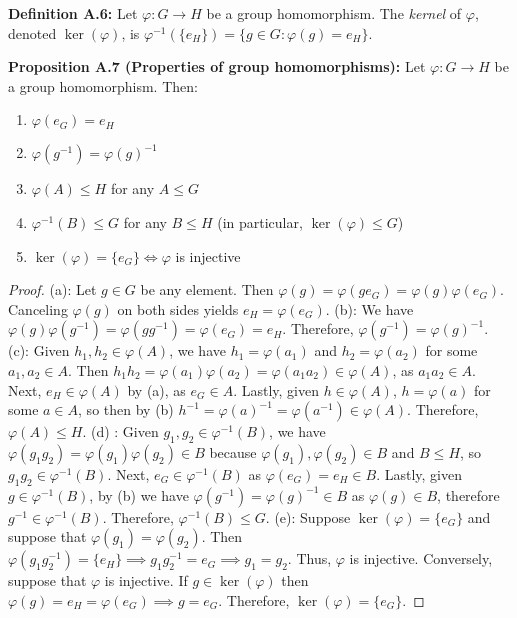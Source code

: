 \documentclass[12pt]{article}
\newcommand{\vs}{\vskip10pt}
\begin{document}
	\vs 
	
	\textbf{Definition A.6: } Let $\varphi: G \rightarrow H$ be a group homomorphism. The \textit{kernel} of $\varphi$, denoted $\ker(\varphi)$, is $\varphi^{-1} (\{e_H\}) = \{g \in G : \varphi(g) = e_H\}$.
	
	\vs 
	
	\textbf{Proposition A.7 (Properties of group homomorphisms): } Let $\varphi: G \rightarrow H$ be a group homomorphism. Then:
	
	\begin{enumerate} [label = (\alph*)]
		\item $\varphi(e_G) = e_H$
		\item $\varphi(g^{-1}) = \varphi(g)^{-1}$
		\item $\varphi(A) \leq H$ for any $A \leq G$
		\item $\varphi^{-1}(B) \leq G$ for any $B \leq H$ (in particular, $\ker(\varphi) \leq G$)
		\item $\ker(\varphi) = \{e_G\} \iff \varphi$ is injective
	\end{enumerate}
	
	\begin{proof}
		
		(a): Let $g \in G$ be any element. Then $\varphi(g) = \varphi(ge_G) = \varphi(g) \varphi(e_G)$. Canceling $\varphi(g)$ on both sides yields $e_H = \varphi(e_G)$. 
		\vs
		(b): We have $\varphi(g) \varphi(g^{-1}) = \varphi(g g^{-1}) = \varphi(e_G) = e_H$. Therefore, $\varphi(g^{-1}) = \varphi(g)^{-1}$. 
		\vs
		(c): Given $h_1, h_2 \in \varphi(A)$, we have $h_1 = \varphi(a_1)$ and $h_2 = \varphi(a_2)$ for some $a_1, a_2 \in A$. Then $h_1 h_2 = \varphi(a_1) \varphi(a_2) = \varphi(a_1 a_2) \in \varphi(A)$, as $a_1a_2 \in A$. Next, $e_H \in \varphi(A)$ by (a), as $e_G \in A$. Lastly, given $h \in \varphi(A)$, $h = \varphi(a)$ for some $a \in A$, so then by (b) $h^{-1} = \varphi(a)^{-1} = \varphi(a^{-1}) \in \varphi(A)$. Therefore, $\varphi(A) \leq H$. 
		\vs
		(d) : Given $g_1, g_2 \in \varphi^{-1}(B)$, we have $\varphi(g_1 g_2) = \varphi(g_1) \varphi(g_2) \in B$ because $\varphi(g_1), \varphi(g_2) \in B$ and $B \leq H$, so $g_1 g_2 \in \varphi^{-1}(B)$. Next, $e_G \in \varphi^{-1}(B)$ as $\varphi(e_G) = e_H \in B$. Lastly, given $g \in \varphi^{-1}(B)$, by (b) we have $\varphi(g^{-1}) = \varphi(g)^{-1} \in B$ as $\varphi(g) \in B$, therefore $g^{-1} \in \varphi^{-1}(B)$. Therefore, $\varphi^{-1}(B) \leq G$. 
		\vs 
		(e): Suppose $\ker(\varphi) = \{e_G\}$ and suppose that $\varphi(g_1) = \varphi(g_2)$. Then $\varphi(g_1 g_2^{-1}) = \{e_H\} \implies g_1 g_2^{-1} = e_G \implies g_1 = g_2$. Thus, $\varphi$ is injective. Conversely, suppose that $\varphi$ is injective. If $g \in \ker(\varphi)$ then $\varphi(g) = e_H = \varphi(e_G) \implies g = e_G$. Therefore, $\ker(\varphi) = \{e_G\}$. 
		
	\end{proof}
	
\end{document}
